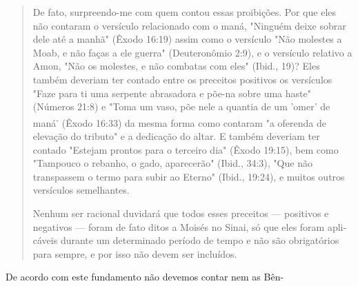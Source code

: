 \begin{quote}
De fato, surpreendo-me com quem contou essas proibições. Por que eles
não contaram o versículo relacionado com o maná, "Ninguém deixe so­brar
dele até a manhã" (Êxodo 16:19) assim como o versículo "Não molestes a
Moab, e não faças a ele guerra" (Deuteronômio 2:9), e o versículo
relativo a Amon, "Não os molestes, e não combatas com eles" (Ibid., 19)?
Eles também deveriam ter contado entre os preceitos positivos os
versículos "Faze para ti uma serpente abrasadora e põe-na sobre uma
haste" (Números 21:8) e "Toma um vaso, põe nele a quantia de um 'omer'
de maná\textsuperscript{-} (Êxodo 16:33) da mesma forma como contaram "a
oferenda de elevação do tributo" e a dedicação do altar. E também
deveriam ter contado "Estejam prontos para o terceiro dia" (Êxodo
19:15), bem como "Tampouco o rebanho, o gado, aparecerão" (Ibid., 34:3),
"Que não transpassem o termo para subir ao Eterno" (Ibid., 19:24), e
muitos outros versículos semelhantes.

Nenhum ser racional duvidará que todos esses preceitos --- positi­vos e
negativos --- foram de fato ditos a Moisés no Sinai, só que eles foram
apli­cáveis durante um determinado período de tempo e não são
obrigatórios para sempre, e por isso não devem ser incluídos.
\end{quote}

De acordo com este fundamento não devemos contar nem as Bên-


